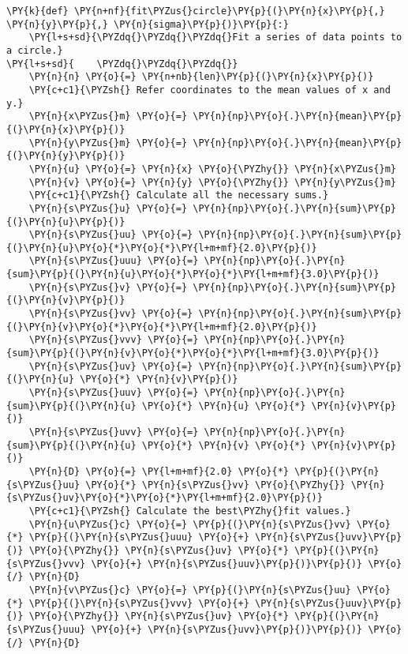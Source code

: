 \begin{Verbatim}[label=\makebox{\href{https://bitbucket.org/lbaldini/statnotes/src/master/snippets/fit\_circle.py}{https://bitbucket.org/.../fit\_circle.py}},commandchars=\\\{\}]
\PY{k}{def} \PY{n+nf}{fit\PYZus{}circle}\PY{p}{(}\PY{n}{x}\PY{p}{,} \PY{n}{y}\PY{p}{,} \PY{n}{sigma}\PY{p}{)}\PY{p}{:}
    \PY{l+s+sd}{\PYZdq{}\PYZdq{}\PYZdq{}Fit a series of data points to a circle.}
\PY{l+s+sd}{    \PYZdq{}\PYZdq{}\PYZdq{}}
    \PY{n}{n} \PY{o}{=} \PY{n+nb}{len}\PY{p}{(}\PY{n}{x}\PY{p}{)}
    \PY{c+c1}{\PYZsh{} Refer coordinates to the mean values of x and y.}
    \PY{n}{x\PYZus{}m} \PY{o}{=} \PY{n}{np}\PY{o}{.}\PY{n}{mean}\PY{p}{(}\PY{n}{x}\PY{p}{)}
    \PY{n}{y\PYZus{}m} \PY{o}{=} \PY{n}{np}\PY{o}{.}\PY{n}{mean}\PY{p}{(}\PY{n}{y}\PY{p}{)}
    \PY{n}{u} \PY{o}{=} \PY{n}{x} \PY{o}{\PYZhy{}} \PY{n}{x\PYZus{}m}
    \PY{n}{v} \PY{o}{=} \PY{n}{y} \PY{o}{\PYZhy{}} \PY{n}{y\PYZus{}m}
    \PY{c+c1}{\PYZsh{} Calculate all the necessary sums.}
    \PY{n}{s\PYZus{}u} \PY{o}{=} \PY{n}{np}\PY{o}{.}\PY{n}{sum}\PY{p}{(}\PY{n}{u}\PY{p}{)}
    \PY{n}{s\PYZus{}uu} \PY{o}{=} \PY{n}{np}\PY{o}{.}\PY{n}{sum}\PY{p}{(}\PY{n}{u}\PY{o}{*}\PY{o}{*}\PY{l+m+mf}{2.0}\PY{p}{)}
    \PY{n}{s\PYZus{}uuu} \PY{o}{=} \PY{n}{np}\PY{o}{.}\PY{n}{sum}\PY{p}{(}\PY{n}{u}\PY{o}{*}\PY{o}{*}\PY{l+m+mf}{3.0}\PY{p}{)}
    \PY{n}{s\PYZus{}v} \PY{o}{=} \PY{n}{np}\PY{o}{.}\PY{n}{sum}\PY{p}{(}\PY{n}{v}\PY{p}{)}
    \PY{n}{s\PYZus{}vv} \PY{o}{=} \PY{n}{np}\PY{o}{.}\PY{n}{sum}\PY{p}{(}\PY{n}{v}\PY{o}{*}\PY{o}{*}\PY{l+m+mf}{2.0}\PY{p}{)}
    \PY{n}{s\PYZus{}vvv} \PY{o}{=} \PY{n}{np}\PY{o}{.}\PY{n}{sum}\PY{p}{(}\PY{n}{v}\PY{o}{*}\PY{o}{*}\PY{l+m+mf}{3.0}\PY{p}{)}
    \PY{n}{s\PYZus{}uv} \PY{o}{=} \PY{n}{np}\PY{o}{.}\PY{n}{sum}\PY{p}{(}\PY{n}{u} \PY{o}{*} \PY{n}{v}\PY{p}{)}
    \PY{n}{s\PYZus{}uuv} \PY{o}{=} \PY{n}{np}\PY{o}{.}\PY{n}{sum}\PY{p}{(}\PY{n}{u} \PY{o}{*} \PY{n}{u} \PY{o}{*} \PY{n}{v}\PY{p}{)}
    \PY{n}{s\PYZus{}uvv} \PY{o}{=} \PY{n}{np}\PY{o}{.}\PY{n}{sum}\PY{p}{(}\PY{n}{u} \PY{o}{*} \PY{n}{v} \PY{o}{*} \PY{n}{v}\PY{p}{)}
    \PY{n}{D} \PY{o}{=} \PY{l+m+mf}{2.0} \PY{o}{*} \PY{p}{(}\PY{n}{s\PYZus{}uu} \PY{o}{*} \PY{n}{s\PYZus{}vv} \PY{o}{\PYZhy{}} \PY{n}{s\PYZus{}uv}\PY{o}{*}\PY{o}{*}\PY{l+m+mf}{2.0}\PY{p}{)}
    \PY{c+c1}{\PYZsh{} Calculate the best\PYZhy{}fit values.}
    \PY{n}{u\PYZus{}c} \PY{o}{=} \PY{p}{(}\PY{n}{s\PYZus{}vv} \PY{o}{*} \PY{p}{(}\PY{n}{s\PYZus{}uuu} \PY{o}{+} \PY{n}{s\PYZus{}uvv}\PY{p}{)} \PY{o}{\PYZhy{}} \PY{n}{s\PYZus{}uv} \PY{o}{*} \PY{p}{(}\PY{n}{s\PYZus{}vvv} \PY{o}{+} \PY{n}{s\PYZus{}uuv}\PY{p}{)}\PY{p}{)} \PY{o}{/} \PY{n}{D}
    \PY{n}{v\PYZus{}c} \PY{o}{=} \PY{p}{(}\PY{n}{s\PYZus{}uu} \PY{o}{*} \PY{p}{(}\PY{n}{s\PYZus{}vvv} \PY{o}{+} \PY{n}{s\PYZus{}uuv}\PY{p}{)} \PY{o}{\PYZhy{}} \PY{n}{s\PYZus{}uv} \PY{o}{*} \PY{p}{(}\PY{n}{s\PYZus{}uuu} \PY{o}{+} \PY{n}{s\PYZus{}uvv}\PY{p}{)}\PY{p}{)} \PY{o}{/} \PY{n}{D}

\end{Verbatim}
